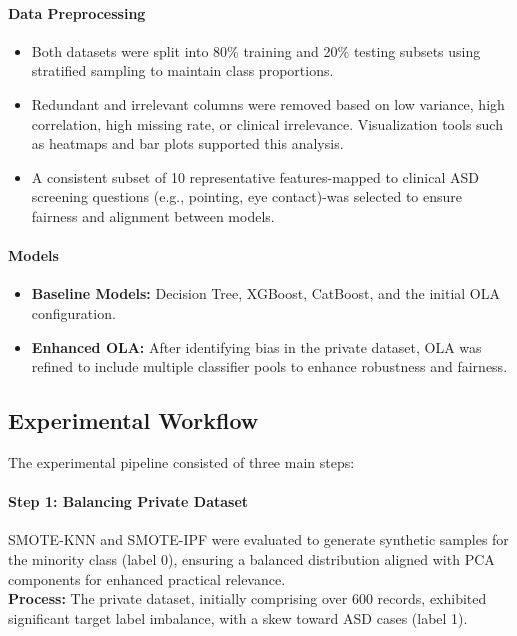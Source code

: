 \documentclass[conference]{IEEEtran}
\begin{document}
\paragraph{\textbf{Data Preprocessing}}
\begin{itemize}
\item Both datasets were split into 80\% training and 20\% testing subsets using stratified sampling to maintain class proportions.
\item Redundant and irrelevant columns were removed based on low variance, high correlation, high missing rate, or clinical irrelevance. Visualization tools such as heatmaps and bar plots supported this analysis.
\item A consistent subset of 10 representative features-mapped to clinical ASD screening questions (e.g., pointing, eye contact)-was selected to ensure fairness and alignment between models.
\end{itemize}

\paragraph{\textbf{Models}}
\begin{itemize}
\item \textbf{Baseline Models:} Decision Tree, XGBoost, CatBoost, and the initial OLA configuration.
\item \textbf{Enhanced OLA:} After identifying bias in the private dataset, OLA was refined to include multiple classifier pools to enhance robustness and fairness.
\end{itemize}

\subsection{Experimental Workflow}
The experimental pipeline consisted of three main steps:
\paragraph{\textbf{Step 1: Balancing Private Dataset}}

SMOTE-KNN and SMOTE-IPF were evaluated to generate synthetic samples for the minority class (label 0), ensuring a balanced distribution aligned with PCA components for enhanced practical relevance.\\
\textbf{Process:} The private dataset, initially comprising over 600 records, exhibited significant target label imbalance, with a skew toward ASD cases (label 1). 
\end{document}

